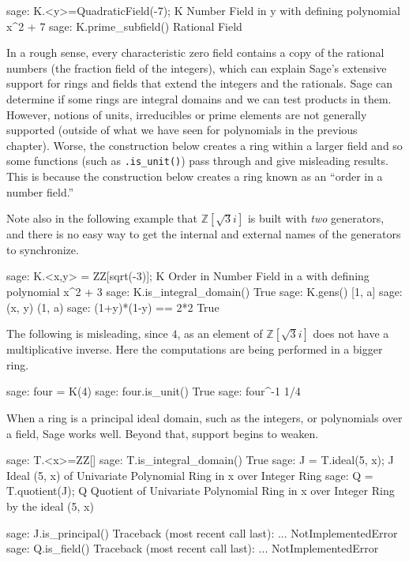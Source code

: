 %
\begin{sageexample}
sage: K.<y>=QuadraticField(-7); K
Number Field in y with defining polynomial x^2 + 7
sage: K.prime_subfield()
Rational Field
\end{sageexample}
%
In a rough sense, every characteristic zero field contains a copy of the rational numbers (the fraction field of the integers), which can explain Sage's extensive support for rings and fields that extend the integers and the rationals.
%
%
Sage can determine if some rings are integral domains and we can test products in them.  However, notions of units, irreducibles or prime elements are not generally supported (outside of what we have seen for polynomials in the previous chapter).  Worse, the construction below creates a ring within a larger field and so some functions (such as \verb?.is_unit()?) pass through and give misleading results.  This is because the construction below creates a ring known as an ``order in a number field.''\par
%
Note also in the following example that ${\mathbb Z}[\sqrt{3}i]$ is built with \emph{two} generators, and there is no easy way to get the internal and external names of the generators to synchronize.
%
\begin{sageexample}
sage: K.<x,y> = ZZ[sqrt(-3)]; K
Order in Number Field in a with defining polynomial x^2 + 3
sage: K.is_integral_domain()
True
sage: K.gens()
[1, a]
sage: (x, y)
(1, a)
sage: (1+y)*(1-y) == 2*2
True
\end{sageexample}
%
The following is misleading, since $4$, as an element of ${\mathbb Z}[\sqrt{3}i]$ does not have a multiplicative inverse.  Here the computations are being performed in a bigger ring.
%
\begin{sageexample}
sage: four = K(4)
sage: four.is_unit()
True
sage: four^-1
1/4
\end{sageexample}
%
%
When a ring is a principal ideal domain, such as the integers, or polynomials over a field, Sage works well.  Beyond that, support begins to weaken.
%
\begin{sageexample}
sage: T.<x>=ZZ[]
sage: T.is_integral_domain()
True
sage: J = T.ideal(5, x); J
Ideal (5, x) of Univariate Polynomial Ring in x over Integer Ring
sage: Q = T.quotient(J); Q
Quotient of Univariate Polynomial Ring in x over
Integer Ring by the ideal (5, x)
\end{sageexample}
%
\begin{sageexample}
sage: J.is_principal()
Traceback (most recent call last):
...
NotImplementedError
sage: Q.is_field()
Traceback (most recent call last):
...
NotImplementedError
\end{sageexample}
%








